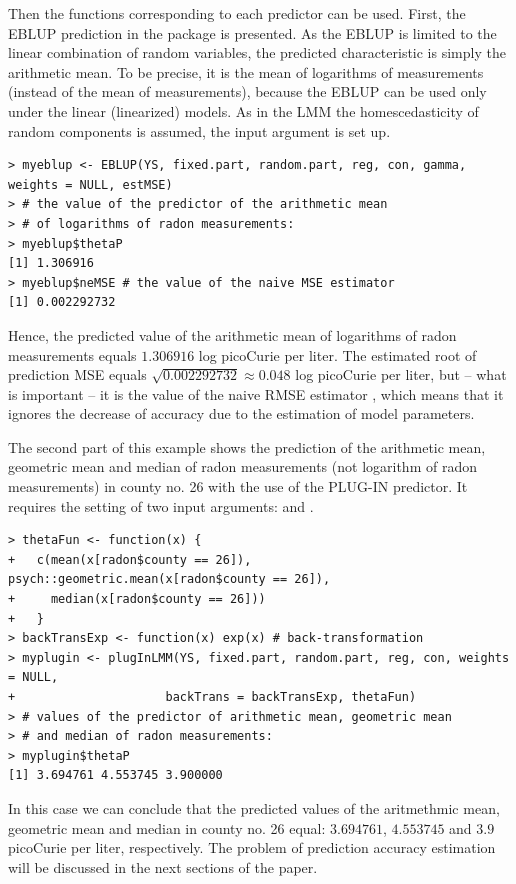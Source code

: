 Then the functions corresponding to each predictor can be used. First,  the EBLUP prediction in the package  is presented.  As the EBLUP is limited to  the linear combination of random variables, the predicted characteristic is simply the arithmetic mean. To be precise, it is the mean of logarithms of measurements (instead of the mean of measurements), because the EBLUP can be used only under the linear (linearized) models. As in the LMM the homescedasticity of random components is assumed, the input argument  is set up.

\begin{verbatim}
> myeblup <- EBLUP(YS, fixed.part, random.part, reg, con, gamma,  weights = NULL, estMSE)
> # the value of the predictor of the arithmetic mean
> # of logarithms of radon measurements:
> myeblup$thetaP
[1] 1.306916
> myeblup$neMSE # the value of the naive MSE estimator
[1] 0.002292732
\end{verbatim}
Hence, the predicted value of the arithmetic mean of logarithms of radon measurements equals $1.306916$ log picoCurie per liter. The estimated root of prediction MSE equals $\sqrt{0.002292732} \approx 0.048$ log picoCurie per liter, but -- what is important -- it is the value of the naive RMSE estimator \citep[as defined by][p. 106]{rao2015small}, which means that it ignores the decrease of accuracy due to the estimation of model parameters.

 The second part of this example shows the prediction of the arithmetic mean, geometric mean and median of radon measurements (not logarithm of radon measurements) in county no. 26 with the use of the PLUG-IN predictor. It requires the setting of two input arguments:  and .

\begin{verbatim}
> thetaFun <- function(x) {
+   c(mean(x[radon$county == 26]), psych::geometric.mean(x[radon$county == 26]),
+     median(x[radon$county == 26]))
+   }
> backTransExp <- function(x) exp(x) # back-transformation
> myplugin <- plugInLMM(YS, fixed.part, random.part, reg, con, weights = NULL,
+                     backTrans = backTransExp, thetaFun)
> # values of the predictor of arithmetic mean, geometric mean
> # and median of radon measurements:
> myplugin$thetaP
[1] 3.694761 4.553745 3.900000
\end{verbatim}
In this case  we can conclude that the predicted values of the aritmethmic mean, geometric mean and median in county no. 26 equal: $3.694761$, $4.553745$ and $3.9$ picoCurie per liter, respectively. The problem of prediction accuracy estimation will be discussed in the next sections of the paper.

